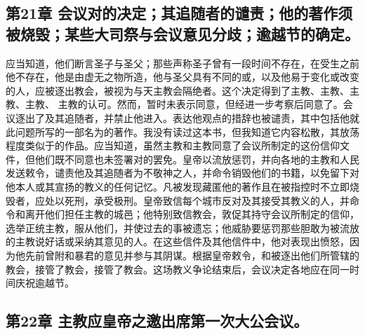 
\subsection{第21章 会议对的决定；其追随者的谴责；他的著作须被烧毁；某些大司祭与会议意见分歧；逾越节的确定。}

应当知道，他们断言圣子与圣父；那些声称圣子曾有一段时间不存在，在受生之前他不存在，他是由虚无之物所造，他与圣父具有不同的或，以及他易于变化或改变的人，应被逐出教会，被视为与天主教会隔绝者。这个决定得到了主教、主教、主教、主教、 主教的认可。然而，暂时未表示同意，但经进一步考察后同意了。会议逐出了及其追随者，并禁止他进入。表达他观点的措辞也被谴责，其中包括他就此问题所写的一部名为的著作。我没有读过这本书，但我知道它内容松散，其放荡程度类似于的作品。应当知道，虽然主教和主教同意了会议所制定的这份信仰文件，但他们既不同意也未签署对的罢免。皇帝以流放惩罚，并向各地的主教和人民发送敕令，谴责他及其追随者为不敬神之人，并命令销毁他们的书籍，以免留下对他本人或其宣扬的教义的任何记忆。凡被发现藏匿他的著作且在被指控时不立即烧毁者，应处以死刑，承受极刑。皇帝致信每个城市反对及其接受其教义的人，并命令和离开他们担任主教的城邑；他特别致信教会，敦促其持守会议所制定的信仰，选举正统主教，服从他们，并使过去的事被遗忘；他威胁要惩罚那些胆敢为被流放的主教说好话或采纳其意见的人。在这些信件及其他信件中，他对表现出愤怒，因为他先前曾附和暴君的意见并参与其阴谋。根据皇帝敕令，和被逐出他们所管辖的教会，接管了教会，接管了教会。这场教义争论结束后，会议决定各地应在同一时间庆祝逾越节。\par


\subsection{第22章 主教应皇帝之邀出席第一次大公会议。}

